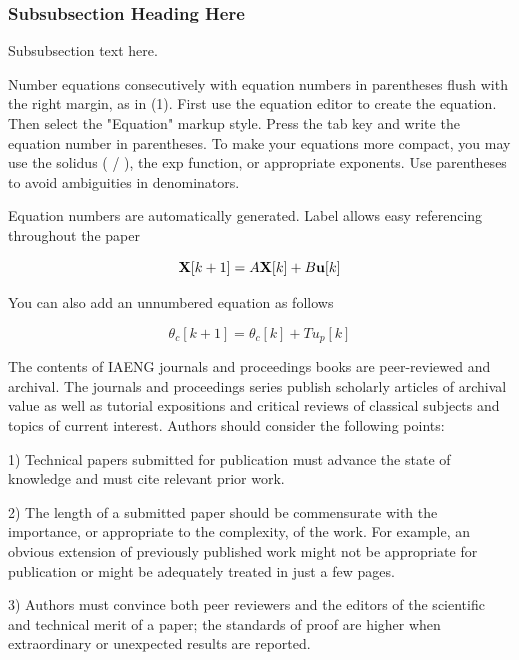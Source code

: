 \documentclass[journal]{IAENGtran}
\begin{document}

\subsubsection{Subsubsection Heading Here}
Subsubsection text here.

Number equations consecutively with equation numbers in parentheses
flush with the right margin, as in (1). First use the equation
editor to create the equation. Then select the "Equation" markup
style. Press the tab key and write the equation number in
parentheses. To make your equations more compact, you may use the
solidus ( / ), the exp function, or appropriate exponents. Use
parentheses to avoid ambiguities in denominators.



Equation numbers are automatically generated.  Label allows easy
referencing throughout the paper

\begin{equation}
{\bf X}[k+1]=A{\bf X}[k]+B{\bf u}[k] \label{stateSpaceForm1}
\end{equation}


You can also add an unnumbered equation as follows

$$
\theta_c[k+1]=\theta_c[k]+Tu_p[k]
$$


The contents of IAENG journals and proceedings books are
peer-reviewed and archival. The journals and proceedings series
publish scholarly articles of archival value as well as tutorial
expositions and critical reviews of classical subjects and topics of
current interest. Authors should consider the following points:

1) Technical papers submitted for publication must advance the state
of knowledge and must cite relevant prior work.

2)  The length of a submitted paper should be commensurate with the
importance, or appropriate to the complexity, of the work. For
example, an obvious extension of previously published work might not
be appropriate for publication or might be adequately treated in
just a few pages.

3) Authors must convince both peer reviewers and the editors of the
scientific and technical merit of a paper; the standards of proof
are higher when extraordinary or unexpected results are reported.
\end{document}
